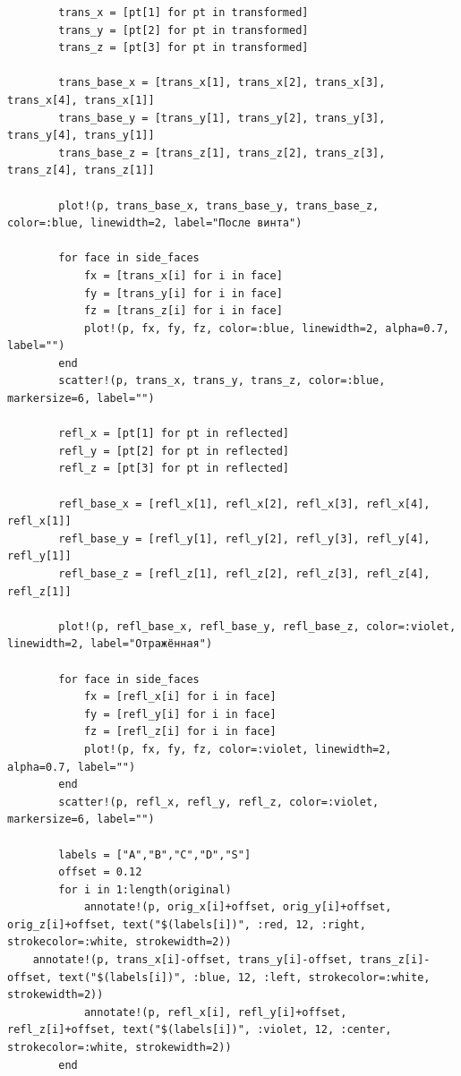 \begin{verbatim}
        trans_x = [pt[1] for pt in transformed]
        trans_y = [pt[2] for pt in transformed]
        trans_z = [pt[3] for pt in transformed]
        
        trans_base_x = [trans_x[1], trans_x[2], trans_x[3], trans_x[4], trans_x[1]]
        trans_base_y = [trans_y[1], trans_y[2], trans_y[3], trans_y[4], trans_y[1]]
        trans_base_z = [trans_z[1], trans_z[2], trans_z[3], trans_z[4], trans_z[1]]
        
        plot!(p, trans_base_x, trans_base_y, trans_base_z, color=:blue, linewidth=2, label="После винта")
        
        for face in side_faces
            fx = [trans_x[i] for i in face]
            fy = [trans_y[i] for i in face]
            fz = [trans_z[i] for i in face]
            plot!(p, fx, fy, fz, color=:blue, linewidth=2, alpha=0.7, label="")
        end
        scatter!(p, trans_x, trans_y, trans_z, color=:blue, markersize=6, label="")

        refl_x = [pt[1] for pt in reflected]
        refl_y = [pt[2] for pt in reflected]
        refl_z = [pt[3] for pt in reflected]
        
        refl_base_x = [refl_x[1], refl_x[2], refl_x[3], refl_x[4], refl_x[1]]
        refl_base_y = [refl_y[1], refl_y[2], refl_y[3], refl_y[4], refl_y[1]]
        refl_base_z = [refl_z[1], refl_z[2], refl_z[3], refl_z[4], refl_z[1]]
        
        plot!(p, refl_base_x, refl_base_y, refl_base_z, color=:violet, linewidth=2, label="Отражённая")
        
        for face in side_faces
            fx = [refl_x[i] for i in face]
            fy = [refl_y[i] for i in face]
            fz = [refl_z[i] for i in face]
            plot!(p, fx, fy, fz, color=:violet, linewidth=2, alpha=0.7, label="")
        end
        scatter!(p, refl_x, refl_y, refl_z, color=:violet, markersize=6, label="")

        labels = ["A","B","C","D","S"]
        offset = 0.12
        for i in 1:length(original)
            annotate!(p, orig_x[i]+offset, orig_y[i]+offset, orig_z[i]+offset, text("$(labels[i])", :red, 12, :right, strokecolor=:white, strokewidth=2))
    annotate!(p, trans_x[i]-offset, trans_y[i]-offset, trans_z[i]-offset, text("$(labels[i])", :blue, 12, :left, strokecolor=:white, strokewidth=2))
            annotate!(p, refl_x[i], refl_y[i]+offset, refl_z[i]+offset, text("$(labels[i])", :violet, 12, :center, strokecolor=:white, strokewidth=2))
        end
        

\end{verbatim}
